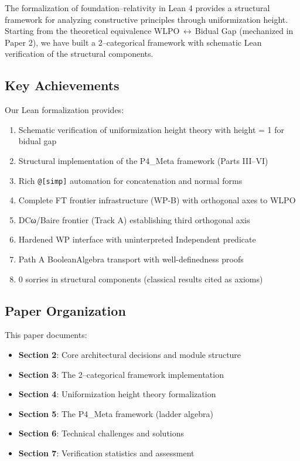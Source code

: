 \documentclass[11pt]{article}
\theoremstyle{definition}
\theoremstyle{remark}
\begin{document}
The formalization of foundation--relativity in Lean 4 provides a structural framework for analyzing constructive principles through uniformization height. Starting from the theoretical equivalence WLPO\,$\leftrightarrow$\,Bidual Gap (mechanized in Paper 2), we have built a 2--categorical framework with schematic Lean verification of the structural components.

\subsection{Key Achievements}

Our Lean formalization provides:
\begin{enumerate}
\item Schematic verification of uniformization height theory with height = 1 for bidual gap
\item Structural implementation of the P4\_Meta framework (Parts III--VI)
\item Rich \texttt{@[simp]} automation for concatenation and normal forms
\item Complete FT frontier infrastructure (WP-B) with orthogonal axes to WLPO
\item DCω/Baire frontier (Track A) establishing third orthogonal axis
\item Hardened WP interface with uninterpreted Independent predicate
\item Path A BooleanAlgebra transport with well-definedness proofs
\item 0 sorries in structural components (classical results cited as axioms)
\end{enumerate}

\subsection{Paper Organization}

This paper documents:
\begin{itemize}
\item \textbf{Section 2}: Core architectural decisions and module structure
\item \textbf{Section 3}: The 2--categorical framework implementation
\item \textbf{Section 4}: Uniformization height theory formalization
\item \textbf{Section 5}: The P4\_Meta framework (ladder algebra)
\item \textbf{Section 6}: Technical challenges and solutions
\item \textbf{Section 7}: Verification statistics and assessment
\end{itemize}
\end{document}
